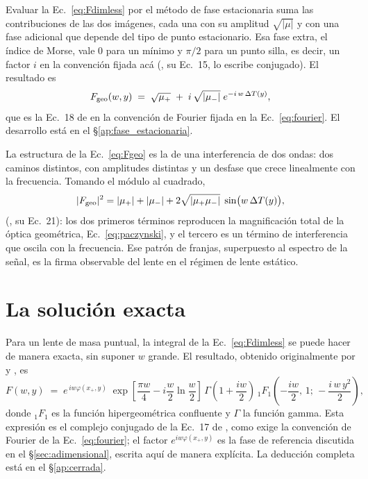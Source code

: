 \documentclass[11pt,a4paper,openany]{book}
\begin{document}
Evaluar la Ec.~\eqref{eq:Fdimless} por el m\'etodo de fase estacionaria suma
las contribuciones de las dos im\'agenes, cada una con su amplitud
$\sqrt{|\mu|}$ y con una fase adicional que depende del tipo de punto
estacionario. Esa fase extra, el \'indice de Morse, vale $0$ para un m\'inimo
y $\pi/2$ para un punto silla, es decir, un factor $i$ en la convenci\'on
fijada ac\'a (\citealp{Takahashi2003}, su Ec.~15, lo escribe conjugado). El
resultado es
\begin{equation}
  F_{\rm geo}(w,y)\;=\;\sqrt{\mu_+}\;+\;i\,\sqrt{|\mu_-|}\;
  e^{-i\,w\,\Delta T(y)} ,
  \label{eq:Fgeo}
\end{equation}
que es la Ec.~18 de \citet{Takahashi2003} en la convenci\'on de Fourier
fijada en la Ec.~\eqref{eq:fourier}. El desarrollo est\'a en el
\S\ref{ap:fase_estacionaria}.

La estructura de la Ec.~\eqref{eq:Fgeo} es la de una interferencia de dos
ondas: dos caminos distintos, con amplitudes distintas y un desfase que crece
linealmente con la frecuencia. Tomando el m\'odulo al cuadrado,
\begin{equation}
  |F_{\rm geo}|^{2}=|\mu_+|+|\mu_-|
  +2\sqrt{|\mu_+\mu_-|}\;\sin\!\big(w\,\Delta T(y)\big) ,
  \label{eq:fringes}
\end{equation}
(\citealp{Takahashi2003}, su Ec.~21): los dos primeros t\'erminos reproducen
la magnificaci\'on total de la \'optica geom\'etrica, Ec.~\eqref{eq:paczynski},
y el tercero es un t\'ermino de interferencia que oscila con la frecuencia. Ese
patr\'on de franjas, superpuesto al espectro de la se\~nal, es la firma
observable del lente en el r\'egimen de lente est\'atico.

\section{La soluci\'on exacta}
\label{sec:closedform}

Para un lente de masa puntual, la integral de la Ec.~\eqref{eq:Fdimless} se
puede hacer de manera exacta, sin suponer $w$ grande. El resultado, obtenido
originalmente por \citet{Peters1974} y \citet{Deguchi1986}, es
\begin{equation}
  F(w,y)\;=\;e^{\,iw\varphi(x_+,y)}\;
  \exp\!\left[\frac{\pi w}{4}-i\frac{w}{2}\ln\frac{w}{2}\right]\,
  \Gamma\!\left(1+\frac{iw}{2}\right)\,
  {}_1F_1\!\left(-\frac{iw}{2},\,1;\,-\frac{i\,w\,y^{2}}{2}\right) ,
  \label{eq:Fclosed}
\end{equation}
donde ${}_1F_1$ es la funci\'on hipergeom\'etrica confluente y $\Gamma$ la
funci\'on gamma. Esta expresi\'on es el complejo conjugado de la Ec.~17 de
\citet{Takahashi2003}, como exige la convenci\'on de Fourier de la
Ec.~\eqref{eq:fourier}; el factor $e^{iw\varphi(x_+,y)}$ es la fase de
referencia discutida en el \S\ref{sec:adimensional}, escrita aqu\'i de manera
expl\'icita. La deducci\'on completa est\'a en el \S\ref{ap:cerrada}.
\end{document}

